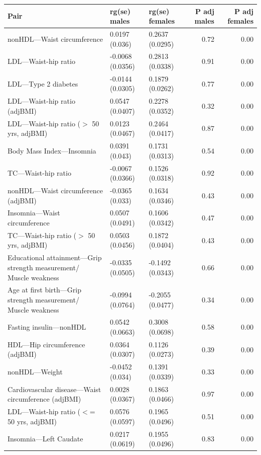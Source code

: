 \begin{table}[ht]
\centering
\begin{tabular}{lllrr}
  \hline
Pair & rg(se) males & rg(se) females & P adj males & P adj females \\ 
  \hline
nonHDL---Waist circumference & 0.0197 (0.036) & 0.2637 (0.0295) & 0.72 & 0.00 \\ 
  LDL---Waist-hip ratio & -0.0068 (0.0356) & 0.2813 (0.0338) & 0.91 & 0.00 \\ 
  LDL---Type 2 diabetes & -0.0144 (0.0305) & 0.1879 (0.0262) & 0.77 & 0.00 \\ 
  LDL---Waist-hip ratio (adjBMI) & 0.0547 (0.0407) & 0.2278 (0.0352) & 0.32 & 0.00 \\ 
  LDL---Waist-hip ratio ($>$ 50 yrs, adjBMI) & 0.0123 (0.0467) & 0.2464 (0.0417) & 0.87 & 0.00 \\ 
  Body Mass Index---Insomnia & 0.0391 (0.043) & 0.1731 (0.0313) & 0.54 & 0.00 \\ 
  TC---Waist-hip ratio & -0.0067 (0.0366) & 0.1526 (0.0318) & 0.92 & 0.00 \\ 
  nonHDL---Waist circumference (adjBMI) & -0.0365 (0.033) & 0.1634 (0.0346) & 0.43 & 0.00 \\ 
  Insomnia---Waist circumference & 0.0507 (0.0491) & 0.1606 (0.0342) & 0.47 & 0.00 \\ 
  TC---Waist-hip ratio ($>$ 50 yrs, adjBMI) & 0.0503 (0.0456) & 0.1872 (0.0404) & 0.43 & 0.00 \\ 
  Educational attainment---Grip strength measurement/ Muscle weakness & -0.0335 (0.0505) & -0.1492 (0.0343) & 0.66 & 0.00 \\ 
  Age at first birth---Grip strength measurement/ Muscle weakness & -0.0994 (0.0764) & -0.2055 (0.0477) & 0.34 & 0.00 \\ 
  Fasting insulin---nonHDL & 0.0542 (0.0663) & 0.3008 (0.0698) & 0.58 & 0.00 \\ 
  HDL---Hip circumference (adjBMI) & 0.0364 (0.0307) & 0.1126 (0.0273) & 0.39 & 0.00 \\ 
  nonHDL---Weight & -0.0452 (0.034) & 0.1391 (0.0339) & 0.33 & 0.00 \\ 
  Cardiovascular disease---Waist circumference (adjBMI) & 0.0028 (0.0367) & 0.1863 (0.0466) & 0.97 & 0.00 \\ 
  LDL---Waist-hip ratio ($<$= 50 yrs, adjBMI) & 0.0576 (0.0597) & 0.1965 (0.0496) & 0.51 & 0.00 \\ 
  Insomnia---Left Caudate & 0.0217 (0.0619) & 0.1955 (0.0496) & 0.83 & 0.00 \\ 

\end{tabular}
\end{table}
